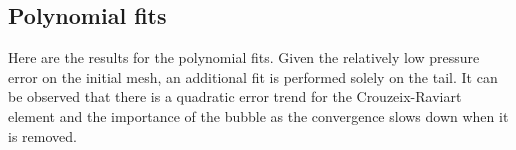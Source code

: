 \subsection{Polynomial fits}

Here are the results for the polynomial fits. Given the relatively low pressure error on the initial mesh, an additional fit is performed solely on the tail. It can be observed that there is a quadratic error trend for the Crouzeix-Raviart element and the importance of the bubble as the convergence slows down when it is removed.

\begin{multicols}{2}
	
	
\end{multicols}